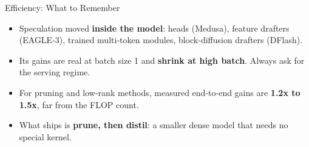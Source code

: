 \begin{frame}{Efficiency: What to Remember}
    \begin{itemize}\itemsep0.55em
        \item Speculation moved \textbf{inside the model}: heads (Medusa), feature drafters (EAGLE-3), trained multi-token modules, block-diffusion drafters (DFlash).
        \item Its gains are real at batch size 1 and \textbf{shrink at high batch}. Always ask for the serving regime.
        \item For pruning and low-rank methods, measured end-to-end gains are \textbf{1.2x to 1.5x}, far from the FLOP count.
        \item What ships is \textbf{prune, then distil}: a smaller dense model that needs no special kernel.
    \end{itemize}
    \vspace{0.4em}
\end{frame}
